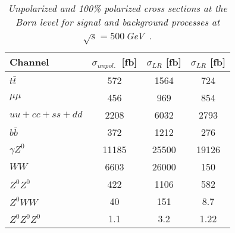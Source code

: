         \begin{table}[H]
        \begin{center}
        \begin{tabular}{l c c c}
        \hline
	Channel & $\sigma_{unpol.}$\ [fb] & $\sigma_{LR}$ [fb] &  $\sigma_{LR}$ [fb] \\
	\hline
	$t\bar{t}$ & 572 & 1564 & 724 \\
	$\mu\mu$ & 456 & 969 & 854 \\
	$uu + cc + ss + dd$ & 2208 & 6032 & 2793 \\
	$b\bar{b}$ & 372 & 1212 & 276 \\
	$\gamma Z^0$ & 11185 & 25500 & 19126 \\
	$WW$ & 6603 & 26000 & 150 \\ 
	$Z^0Z^0$ & 422 & 1106 & 582 \\
	$Z^0WW$ & 40 & 151 & 8.7 \\
	$Z^0 Z^0 Z^0$ & 1.1 & 3.2 & 1.22 \\
        \hline
        \end{tabular}
        \end{center}
        \caption{\sl Unpolarized and 100\% polarized cross sections at the Born level for signal and background processes at $\sqrt{s}=500$\,GeV~\cite{bib:ILCTOP}. }
        \label{table:ttbarsigma}
        \end{table}
